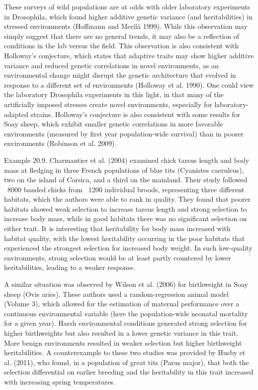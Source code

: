 \documentclass{article}
\begin{document}
These surveys of wild populations are at odds with older laboratory experiments in Drosophila, which found higher additive genetic variance (and heritabilities) in stressed environments (Hoffmann and Merilä 1999). While this observation may simply suggest that there are no general trends, it may also be a reflection of conditions in the lab versus the field. This observation is also consistent with Holloway's conjecture, which states that adaptive traits may show higher additive variance and reduced genetic correlations in novel environments, as an environmental change might disrupt the genetic architecture that evolved in response to a different set of environments (Holloway et al. 1990). One could view the laboratory Drosophila experiments in this light, in that many of the artificially imposed stresses create novel environments, especially for laboratory-adapted strains. Holloway's conjecture is also consistent with some results for Soay sheep, which exhibit smaller genetic correlations in more favorable environments (measured by first year population-wide survival) than in poorer environments (Robinson et al. 2009).

Example 20.9. Charmantier et al. (2004) examined chick tarsus length and body mass at fledging in three French populations of blue tits (Cyanistes caeruleus), two on the island of Corsica, and a third on the mainland. Their study followed ~8000 banded chicks from ~1200 individual broods, representing three different habitats, which the authors were able to rank in quality. They found that poorer habitats showed weak selection to increase tarsus length and strong selection to increase body mass, while in good habitats there was no significant selection on either trait. It is interesting that heritability for body mass increased with habitat quality, with the lowest heritability occurring in the poor habitats that experienced the strongest selection for increased body weight. In such low-quality environments, strong selection would be at least partly countered by lower heritabilities, leading to a weaker response.

A similar situation was observed by Wilson et al. (2006) for birthweight in Soay sheep (Ovis aries). These authors used a random-regression animal model (Volume 3), which allowed for the estimation of maternal performance over a continuous environmental variable (here the population-wide neonatal mortality for a given year). Harsh environmental conditions generated strong selection for higher birthweights but also resulted in a lower genetic variance in this trait. More benign environments resulted in weaker selection but higher birthweight heritabilities. A counterexample to these two studies was provided by Husby et al. (2011), who found, in a population of great tits (Parus major), that both the selection differential on earlier breeding and the heritability in this trait increased with increasing spring temperatures.
\end{document}
